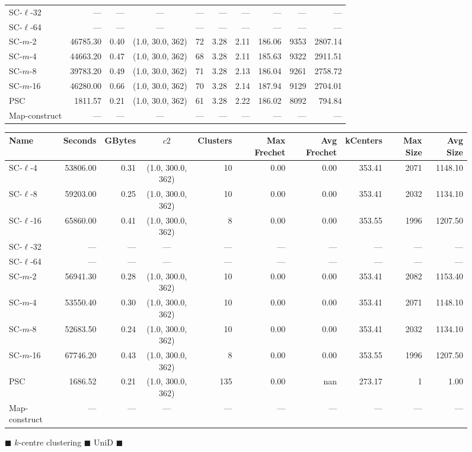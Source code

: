 \begin{figure}
\begin{center}
\begin{minipage}{\textwidth}
{\begin{tabular}{@{}lrrcrrrrrr@{}}
    SC-$\ell$-32 & --- & --- & --- & --- & --- & --- & --- & --- & ---\\
    SC-$\ell$-64 & --- & --- & --- & --- & --- & --- & --- & --- & ---\\
    SC-$m$-2 & 46785.30 & 0.40 & (1.0, 30.0, 362) & 72 & 3.28 & 2.11 & 186.06 & 9353 & 2807.14\\
    SC-$m$-4 & 44663.20 & 0.47 & (1.0, 30.0, 362) & 68 & 3.28 & 2.11 & 185.63 & 9322 & 2911.51\\
    SC-$m$-8 & 39783.20 & 0.49 & (1.0, 30.0, 362) & 71 & 3.28 & 2.13 & 186.04 & 9261 & 2758.72\\
    SC-$m$-16 & 46280.00 & 0.66 & (1.0, 30.0, 362) & 70 & 3.28 & 2.14 & 187.94 & 9129 & 2704.01\\
    PSC & 1811.57 & 0.21 & (1.0, 30.0, 362) & 61 & 3.28 & 2.22 & 186.02 & 8092 & 794.84\\
    Map-construct & --- & --- & --- & --- & --- & --- & --- & --- & ---\\
    \bottomrule
\end{tabular}
}
{
\begin{tabular}{@{}lrrcrrrrrr@{}}
    \toprule
    Name & Seconds & GBytes & $c2$ & Clusters & Max Frechet & Avg Frechet & kCenters & Max Size & Avg Size\\
    \midrule
    SC-$\ell$-4 & 53806.00 & 0.31 & (1.0, 300.0, 362) & 10 & 0.00 & 0.00 & 353.41 & 2071 & 1148.10\\
    SC-$\ell$-8 & 59203.00 & 0.25 & (1.0, 300.0, 362) & 10 & 0.00 & 0.00 & 353.41 & 2032 & 1134.10\\
    SC-$\ell$-16 & 65860.00 & 0.41 & (1.0, 300.0, 362) & 8 & 0.00 & 0.00 & 353.55 & 1996 & 1207.50\\
    SC-$\ell$-32 & --- & --- & --- & --- & --- & --- & --- & --- & ---\\
    SC-$\ell$-64 & --- & --- & --- & --- & --- & --- & --- & --- & ---\\
    SC-$m$-2 & 56941.30 & 0.28 & (1.0, 300.0, 362) & 10 & 0.00 & 0.00 & 353.41 & 2082 & 1153.40\\
    SC-$m$-4 & 53550.40 & 0.30 & (1.0, 300.0, 362) & 10 & 0.00 & 0.00 & 353.41 & 2071 & 1148.10\\
    SC-$m$-8 & 52683.50 & 0.24 & (1.0, 300.0, 362) & 10 & 0.00 & 0.00 & 353.41 & 2032 & 1134.10\\
    SC-$m$-16 & 67746.20 & 0.43 & (1.0, 300.0, 362) & 8 & 0.00 & 0.00 & 353.55 & 1996 & 1207.50\\
    PSC & 1686.52 & 0.21 & (1.0, 300.0, 362) & 135 & 0.00 & nan & 273.17 & 1 & 1.00\\
    Map-construct & --- & --- & --- & --- & --- & --- & --- & --- & ---\\
    \bottomrule
\end{tabular}
}
\end{minipage}
\end{center}
    \caption{$\blacksquare$ $k$-centre clustering $\blacksquare$ UniD $\blacksquare$}
\end{figure}